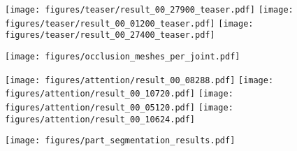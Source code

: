 \documentclass[10pt,twocolumn,letterpaper,usenames,dvipsnames]{article}
\newcommand{\methodname}{PARE\xspace}
\begin{document}
\begin{figure*}[t]
	\centering
	\texttt{[image: figures/teaser/result\_00\_27900\_teaser.pdf]}
	\texttt{[image: figures/teaser/result\_00\_01200\_teaser.pdf]}
	\texttt{[image: figures/teaser/result\_00\_27400\_teaser.pdf]}
\caption{Occlusion Sensitivity Maps of SPIN \cite{SPIN:ICCV:2019} and \methodname}
	\label{fig:teaser-like}
\end{figure*}{}

\begin{figure*}[t]
	\centering
	\texttt{[image: figures/occlusion\_meshes\_per\_joint.pdf]}
\caption{Occlusion sensitivity meshes per joint.}
	\label{fig:occ_mesh_per_joint}
\end{figure*}{}

\begin{figure*}[h]
	\centering
	\texttt{[image: figures/attention/result\_00\_08288.pdf]}
	\texttt{[image: figures/attention/result\_00\_10720.pdf]}
	\texttt{[image: figures/attention/result\_00\_05120.pdf]}
	\texttt{[image: figures/attention/result\_00\_10624.pdf]}
\caption{Part attention maps.}
	\label{fig:attention_map}
\end{figure*}{}

\begin{figure*}[h]
	\centering
	\texttt{[image: figures/part\_segmentation\_results.pdf]}
\caption{Part segmentation results in two different scenarios: (a) full part segmentation supervision is applied during training, (b) part segmentation supervision is applied at the initial stages and training is continued without part supervision. At the top of each result, we denote the part segmentation IoU, MPJPE and PA-MPJPE. Notice how part segmentation IoU decreases, but per-joint accuracy improves.}
	\label{fig:segmentation_map}
\end{figure*}{} 	
\end{document}
